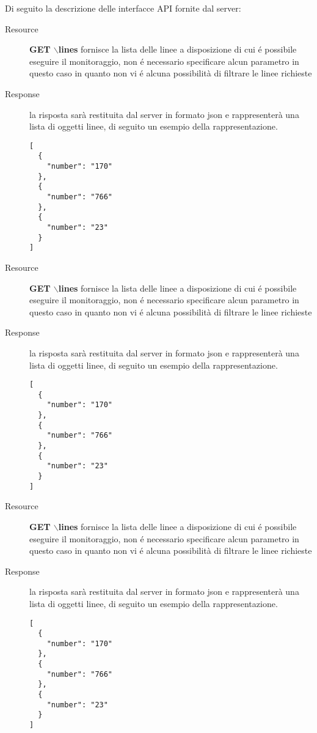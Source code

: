 Di seguito la descrizione delle interfacce API fornite dal server:

\begin{description}
	\item[Resource] \textbf{GET $\backslash$lines} fornisce la lista delle linee a disposizione di cui é possibile eseguire il monitoraggio, non é necessario specificare alcun parametro in questo caso in quanto non vi é alcuna possibilità di filtrare le linee richieste
	\item[Response] la risposta sarà restituita dal server in formato json e rappresenterà una lista di oggetti linee, di seguito un esempio della rappresentazione.

	\begin{verbatim}
[
  {
    "number": "170"
  },
  {
    "number": "766"
  },
  {
    "number": "23"
  }
]
	\end{verbatim}
\end{description}

\begin{description}
	\item[Resource] \textbf{GET $\backslash$lines} fornisce la lista delle linee a disposizione di cui é possibile eseguire il monitoraggio, non é necessario specificare alcun parametro in questo caso in quanto non vi é alcuna possibilità di filtrare le linee richieste
	\item[Response] la risposta sarà restituita dal server in formato json e rappresenterà una lista di oggetti linee, di seguito un esempio della rappresentazione.

	\begin{verbatim}
[
  {
    "number": "170"
  },
  {
    "number": "766"
  },
  {
    "number": "23"
  }
]
	\end{verbatim}
\end{description}

\begin{description}
	\item[Resource] \textbf{GET $\backslash$lines} fornisce la lista delle linee a disposizione di cui é possibile eseguire il monitoraggio, non é necessario specificare alcun parametro in questo caso in quanto non vi é alcuna possibilità di filtrare le linee richieste
	\item[Response] la risposta sarà restituita dal server in formato json e rappresenterà una lista di oggetti linee, di seguito un esempio della rappresentazione.

	\begin{verbatim}
[
  {
    "number": "170"
  },
  {
    "number": "766"
  },
  {
    "number": "23"
  }
]
	\end{verbatim}
\end{description}

